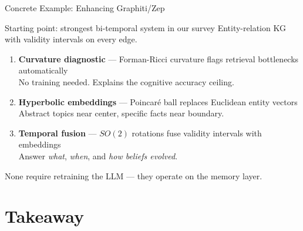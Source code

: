 \documentclass[aspectratio=169]{beamer}
\begin{document}
\begin{frame}{Concrete Example: Enhancing Graphiti/Zep}
  \begin{block}{Starting point: strongest bi-temporal system in our survey}
    Entity-relation KG with validity intervals on every edge.
  \end{block}

  \vspace{0.2cm}

  \begin{enumerate}
    \item \textbf{Curvature diagnostic} --- Forman-Ricci curvature
      \alert{flags retrieval bottlenecks} automatically\\
      {\small No training needed. Explains the cognitive accuracy ceiling.}

    \vspace{0.1cm}

    \item \textbf{Hyperbolic embeddings} --- Poincar\'{e} ball replaces
      Euclidean entity vectors\\
      {\small Abstract topics near center, specific facts near boundary.}

    \vspace{0.1cm}

    \item \textbf{Temporal fusion} --- $SO(2)$ rotations fuse validity
      intervals with embeddings\\
      {\small Answer \emph{what}, \emph{when}, and \emph{how beliefs evolved}.}
  \end{enumerate}

  \vspace{0.1cm}

  \alert{None require retraining the LLM} --- they operate on the memory layer.
\end{frame}

\section{Takeaway}

\begin{frame}[plain]
  \sectionpage
\end{frame}
\end{document}
